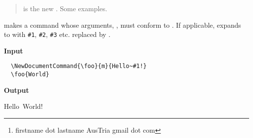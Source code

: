 \documentclass{l3doc}
\author{Erwann Rogard\thanks{firstname dot lastname AusTria gmail dot com}}
\begin{document}
\maketitle

\begin{abstract} is the new . Some examples.\end{abstract}


makes  a command whose arguments, , must conform to . 
If applicable,  expands to  with \verb|#1|, \verb|#2|, \verb|#3| etc. 
replaced by .


\begin{Program}
\textbf{Input}
\begin{verbatim}
  \NewDocumentCommand{\foo}{m}{Hello~#1!}
  \foo{World}
\end{verbatim}
\textbf{Output}\\
\caption{Hello~World!}\label{code:helloworld}
\end{Program}
\end{document}
